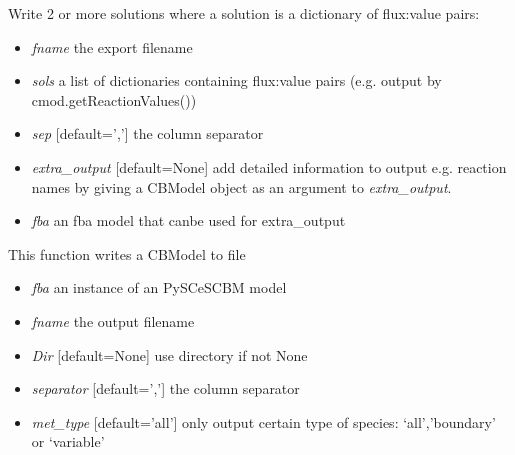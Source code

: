 \documentclass[a4paper,11pt,english]{sphinxmanual}
\begin{document}
\begin{fulllineitems}
\label{modules_doc:cbmpy.CBWrite.writeSolutions}
Write 2 or more solutions where a solution is a dictionary of flux:value pairs:
\begin{itemize}
\item {} 
\emph{fname} the export filename

\item {} 
\emph{sols} a list of dictionaries containing flux:value pairs (e.g. output by cmod.getReactionValues())

\item {} 
\emph{sep} {[}default=','{]} the column separator

\item {} 
\emph{extra\_output} {[}default=None{]} add detailed information to output e.g. reaction names by giving a CBModel object as an argument to \emph{extra\_output}.

\item {} 
\emph{fba} an fba model that canbe used for extra\_output

\end{itemize}

\end{fulllineitems}


\begin{fulllineitems}
\label{modules_doc:cbmpy.CBWrite.writeSpeciesInfoToFile}
This function writes a CBModel to file
\begin{itemize}
\item {} 
\emph{fba} an instance of an PySCeSCBM model

\item {} 
\emph{fname} the output filename

\item {} 
\emph{Dir} {[}default=None{]} use directory if not None

\item {} 
\emph{separator} {[}default=','{]} the column separator

\item {} 
\emph{met\_type} {[}default='all'{]} only output certain type of species: `all','boundary' or `variable'

\end{itemize}

\end{fulllineitems}
\end{document}
